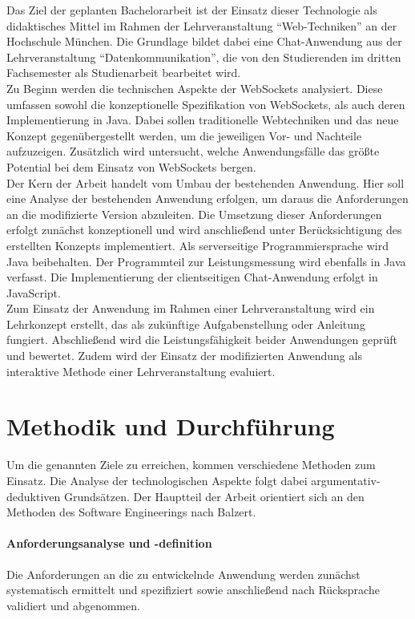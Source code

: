 \documentclass[11pt,a4paper,titlepage]{scrartcl}
\numberwithin{equation}{section}
\begin{document}
\noindent Das Ziel der geplanten Bachelorarbeit ist der Einsatz dieser Technologie als didaktisches Mittel im Rahmen der Lehrveranstaltung “Web-Techniken” an der Hochschule München. Die Grundlage bildet dabei eine Chat-Anwendung aus der Lehrveranstaltung “Datenkommunikation”, die von den Studierenden im dritten Fachsemester als Studienarbeit bearbeitet wird.\\

 \noindent Zu Beginn werden die technischen Aspekte der WebSockets analysiert. Diese umfassen sowohl die konzeptionelle Spezifikation von WebSockets, als auch deren Implementierung in Java. Dabei sollen traditionelle Webtechniken und das neue Konzept gegenübergestellt werden, um die jeweiligen Vor- und Nachteile aufzuzeigen. Zusätzlich wird untersucht, welche Anwendungsfälle das größte Potential bei dem Einsatz von WebSockets bergen. \\
 
 \noindent Der Kern der Arbeit handelt vom Umbau der bestehenden Anwendung. Hier soll eine Analyse der bestehenden Anwendung erfolgen, um daraus die Anforderungen an die modifizierte Version abzuleiten. Die Umsetzung dieser Anforderungen erfolgt zunächst konzeptionell und wird anschließend  unter Berücksichtigung des erstellten Konzepts implementiert. Als serverseitige Programmiersprache wird Java beibehalten. Der Programmteil zur Leistungsmessung wird ebenfalls in Java verfasst. Die Implementierung der clientseitigen Chat-Anwendung erfolgt in JavaScript.\\
 
\noindent Zum Einsatz der Anwendung im Rahmen einer Lehrveranstaltung wird ein Lehrkonzept erstellt, das als zukünftige Aufgabenstellung oder Anleitung fungiert. Abschließend wird die Leistungsfähigkeit beider Anwendungen geprüft und bewertet. Zudem wird der Einsatz der modifizierten Anwendung als interaktive Methode einer Lehrveranstaltung evaluiert.

\section{Methodik und Durchführung}
Um die genannten Ziele zu erreichen, kommen verschiedene Methoden zum Einsatz. Die Analyse der technologischen Aspekte folgt dabei argumentativ-deduktiven Grundsätzen. Der Hauptteil der Arbeit orientiert sich an den Methoden des Software Engineerings nach Balzert. 
 
 \paragraph{Anforderungsanalyse und -definition}Die Anforderungen an die zu entwickelnde Anwendung werden zunächst systematisch ermittelt und spezifiziert sowie anschließend nach Rücksprache validiert und abgenommen. 
\end{document}
